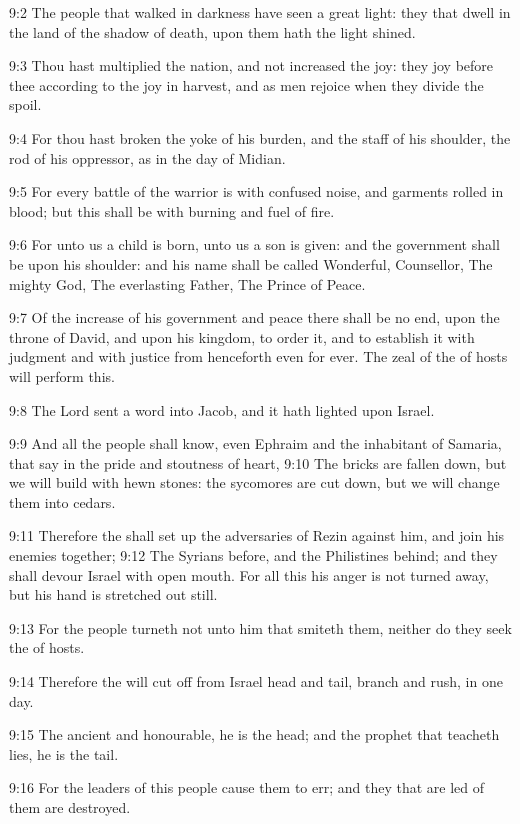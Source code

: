 9:2 The people that walked in darkness have seen a great light: they that dwell in the land of the shadow of death, upon them hath the light shined.

9:3 Thou hast multiplied the nation, and not increased the joy: they joy before thee according to the joy in harvest, and as men rejoice when they divide the spoil.

9:4 For thou hast broken the yoke of his burden, and the staff of his shoulder, the rod of his oppressor, as in the day of Midian.

9:5 For every battle of the warrior is with confused noise, and garments rolled in blood; but this shall be with burning and fuel of fire.

9:6 For unto us a child is born, unto us a son is given: and the government shall be upon his shoulder: and his name shall be called Wonderful, Counsellor, The mighty God, The everlasting Father, The Prince of Peace.

9:7 Of the increase of his government and peace there shall be no end, upon the throne of David, and upon his kingdom, to order it, and to establish it with judgment and with justice from henceforth even for ever. The zeal of the \LORD of hosts will perform this.

9:8 The Lord sent a word into Jacob, and it hath lighted upon Israel.

9:9 And all the people shall know, even Ephraim and the inhabitant of Samaria, that say in the pride and stoutness of heart, 9:10 The bricks are fallen down, but we will build with hewn stones: the sycomores are cut down, but we will change them into cedars.

9:11 Therefore the \LORD shall set up the adversaries of Rezin against him, and join his enemies together; 9:12 The Syrians before, and the Philistines behind; and they shall devour Israel with open mouth. For all this his anger is not turned away, but his hand is stretched out still.

9:13 For the people turneth not unto him that smiteth them, neither do they seek the \LORD of hosts.

9:14 Therefore the \LORD will cut off from Israel head and tail, branch and rush, in one day.

9:15 The ancient and honourable, he is the head; and the prophet that teacheth lies, he is the tail.

9:16 For the leaders of this people cause them to err; and they that are led of them are destroyed.

